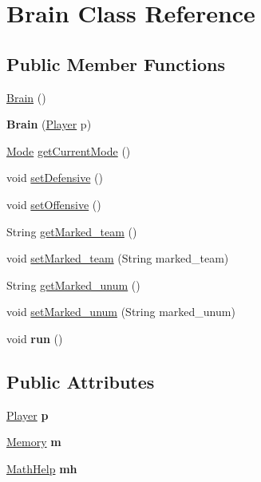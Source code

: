 \hypertarget{classBrain}{
\section{Brain Class Reference}
\label{classBrain}
}
\subsection*{Public Member Functions}
\begin{DoxyCompactItemize}
\item 
\hyperlink{classBrain_a92daf9737361454abbb5988a89b7ff40}{Brain} ()
\item 
\hypertarget{classBrain_a357730d1447734778f5d1aaead94a014}{
{\bfseries Brain} (\hyperlink{classPlayer}{Player} p)}
\label{classBrain_a357730d1447734778f5d1aaead94a014}

\item 
\hyperlink{classMode}{Mode} \hyperlink{classBrain_aa40c476614e4e2ed1d916f57f79434f3}{getCurrentMode} ()
\item 
void \hyperlink{classBrain_a8202fa27d97f85e7c72b9ee57b5c7871}{setDefensive} ()
\item 
void \hyperlink{classBrain_ae5c07b3f9117d3621bf76a76b404e791}{setOffensive} ()
\item 
String \hyperlink{classBrain_ae9fbea1d4bcc42bd7f50760a845bdff6}{getMarked\_\-team} ()
\item 
void \hyperlink{classBrain_ae974f3db85a382f13789987d5b06df96}{setMarked\_\-team} (String marked\_\-team)
\item 
String \hyperlink{classBrain_a50ef5104a556f9f8d19eb9b9759a0c2a}{getMarked\_\-unum} ()
\item 
void \hyperlink{classBrain_aca6efe99d6f3bf59e6795544be98e251}{setMarked\_\-unum} (String marked\_\-unum)
\item 
\hypertarget{classBrain_a968c6e3ff8a199c4d5a4fa8b47de8264}{
void {\bfseries run} ()}
\label{classBrain_a968c6e3ff8a199c4d5a4fa8b47de8264}

\end{DoxyCompactItemize}
\subsection*{Public Attributes}
\begin{DoxyCompactItemize}
\item 
\hypertarget{classBrain_a9bc757e452720382657f4e3396a55a8e}{
\hyperlink{classPlayer}{Player} {\bfseries p}}
\label{classBrain_a9bc757e452720382657f4e3396a55a8e}

\item 
\hypertarget{classBrain_a7bf6c5be9c9e8e7c8d338cbfaf2c5c63}{
\hyperlink{classMemory}{Memory} {\bfseries m}}
\label{classBrain_a7bf6c5be9c9e8e7c8d338cbfaf2c5c63}

\item 
\hypertarget{classBrain_a4535f9e42c979f1dd6b5e4e395f7e3dd}{
\hyperlink{classMathHelp}{MathHelp} {\bfseries mh}}
\label{classBrain_a4535f9e42c979f1dd6b5e4e395f7e3dd}

\end{DoxyCompactItemize}


